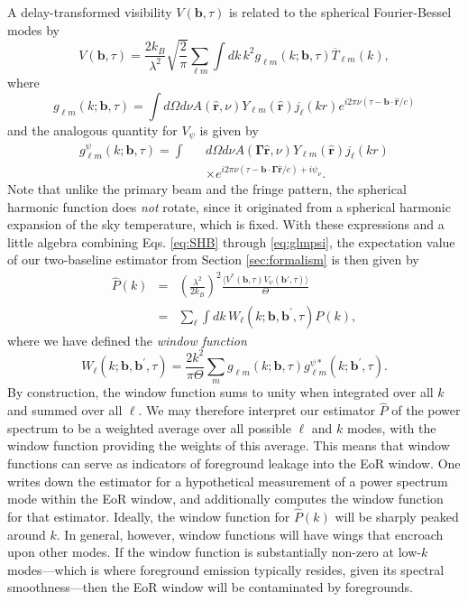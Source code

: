 \documentclass[twocolumn,apj,numberedappendix]{emulateapj}
\renewcommand\[{\begin{equation}}
\renewcommand\]{\end{equation}}
\begin{document}
A delay-transformed visibility $V(\mathbf{b}, \tau) $ is related to the spherical Fourier-Bessel modes by
\begin{equation}
V(\mathbf{b}, \tau) = \frac{2 k_B}{\lambda^2} \sqrt{\frac{2}{\pi}} \sum_{\ell m} \int \! dk\, k^2 g_{\ell m} (k; \mathbf{b}, \tau) \overline{T}_{\ell m} (k),
\end{equation}
where
\begin{equation}
g_{\ell m} (k ; \mathbf{b}, \tau) = \int \! d\Omega d\nu A(\hat{\mathbf{r}},\nu) Y_{\ell m} (\hat{\mathbf{r}}) j_\ell (k r) e^{i 2 \pi \nu (\tau - \mathbf{b}\cdot \hat{\mathbf{r}} / c)}
\end{equation}
and the analogous quantity for $V_\psi$ is given by
\begin{eqnarray}
\label{eq:glmpsi}
g_{\ell m}^\psi (k ; \mathbf{b}, \tau) = \int && d\Omega d\nu A(\boldsymbol \Gamma \hat{\mathbf{r}},\nu) Y_{\ell m} (\hat{\mathbf{r}}) j_\ell (k r) \nonumber \\
&& \times  e^{i 2 \pi \nu (\tau - \mathbf{b}\cdot \boldsymbol \Gamma \hat{\mathbf{r}} / c) + i \psi_\nu}.
\end{eqnarray}
Note that unlike the primary beam and the fringe pattern, the spherical harmonic function does \emph{not} rotate, since it originated from a spherical harmonic expansion of the sky temperature, which is fixed. With these expressions and a little algebra combining Eqs. \eqref{eq:SHB} through \eqref{eq:glmpsi}, the expectation value of our two-baseline estimator from Section \ref{sec:formalism} is then given by
\begin{eqnarray}
\hat{P}(k) &=& \left(\frac{\lambda^{2}}{2k_{B}}\right)^{2} \frac{ \langle V^{*}(\boldsymbol{b},\tau)V_{\psi}(\boldsymbol{b'},\tau) \rangle}{\Theta} \nonumber \\
&=& \sum_\ell \int \!dk\, W_{\ell}(k; \mathbf{b}, \mathbf{b}^\prime , \tau) P(k),
\end{eqnarray}
where we have defined the \emph{window function}
\begin{equation}
W_{\ell}(k; \mathbf{b}, \mathbf{b}^\prime , \tau) = \frac{2 k^2}{\pi \Theta} \sum_m g_{\ell m} (k ; \mathbf{b}, \tau) g_{\ell m}^{\psi*} (k ; \mathbf{b}^\prime, \tau).
\end{equation}
By construction, the window function sums to unity when integrated over all $k$ and summed over all $\ell$. We may therefore interpret our estimator $\hat{P}$ of the power spectrum to be a weighted average over all possible $\ell$ and $k$ modes, with the window function providing the weights of this average. This means that window functions can serve as indicators of foreground leakage into the EoR window. One writes down the estimator for a hypothetical measurement of a power spectrum mode within the EoR window, and additionally computes the window function for that estimator. Ideally, the window function for $\hat{P}(k)$ will be sharply peaked around $k$. In general, however, window functions will have wings that encroach upon other modes. If the window function is substantially non-zero at low-$k$ modes---which is where foreground emission typically resides, given its spectral smoothness---then the EoR window will be contaminated by foregrounds.
\end{document}
